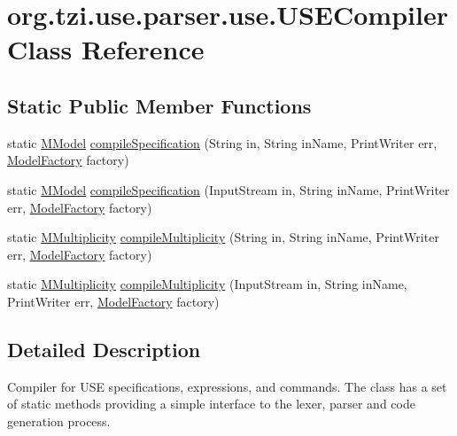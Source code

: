 \hypertarget{classorg_1_1tzi_1_1use_1_1parser_1_1use_1_1_u_s_e_compiler}{\section{org.\-tzi.\-use.\-parser.\-use.\-U\-S\-E\-Compiler Class Reference}
\label{classorg_1_1tzi_1_1use_1_1parser_1_1use_1_1_u_s_e_compiler}
}
\subsection*{Static Public Member Functions}
\begin{DoxyCompactItemize}
\item 
static \hyperlink{classorg_1_1tzi_1_1use_1_1uml_1_1mm_1_1_m_model}{M\-Model} \hyperlink{classorg_1_1tzi_1_1use_1_1parser_1_1use_1_1_u_s_e_compiler_ad1abfb475321796fda8f8677fb485c4e}{compile\-Specification} (String in, String in\-Name, Print\-Writer err, \hyperlink{classorg_1_1tzi_1_1use_1_1uml_1_1mm_1_1_model_factory}{Model\-Factory} factory)
\item 
static \hyperlink{classorg_1_1tzi_1_1use_1_1uml_1_1mm_1_1_m_model}{M\-Model} \hyperlink{classorg_1_1tzi_1_1use_1_1parser_1_1use_1_1_u_s_e_compiler_a272613cb96568733322a4be4e15245bd}{compile\-Specification} (Input\-Stream in, String in\-Name, Print\-Writer err, \hyperlink{classorg_1_1tzi_1_1use_1_1uml_1_1mm_1_1_model_factory}{Model\-Factory} factory)
\item 
static \hyperlink{classorg_1_1tzi_1_1use_1_1uml_1_1mm_1_1_m_multiplicity}{M\-Multiplicity} \hyperlink{classorg_1_1tzi_1_1use_1_1parser_1_1use_1_1_u_s_e_compiler_ace0ab9e07808c1e6bafed103e56a98c6}{compile\-Multiplicity} (String in, String in\-Name, Print\-Writer err, \hyperlink{classorg_1_1tzi_1_1use_1_1uml_1_1mm_1_1_model_factory}{Model\-Factory} factory)
\item 
static \hyperlink{classorg_1_1tzi_1_1use_1_1uml_1_1mm_1_1_m_multiplicity}{M\-Multiplicity} \hyperlink{classorg_1_1tzi_1_1use_1_1parser_1_1use_1_1_u_s_e_compiler_ae79d75f3717ccee6d610aa16a2cc4a23}{compile\-Multiplicity} (Input\-Stream in, String in\-Name, Print\-Writer err, \hyperlink{classorg_1_1tzi_1_1use_1_1uml_1_1mm_1_1_model_factory}{Model\-Factory} factory)
\end{DoxyCompactItemize}


\subsection{Detailed Description}
Compiler for U\-S\-E specifications, expressions, and commands. The class has a set of static methods providing a simple interface to the lexer, parser and code generation process.


